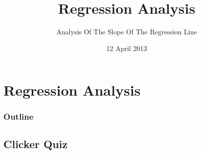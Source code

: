 
\section{Regression Analysis}

\title{Regression Analysis}
\subtitle{Analysis Of The Slope Of The Regression Line}

\date{12 April 2013}

\begin{frame}
  \titlepage
\end{frame}

\begin{frame}
  \frametitle{Outline}
  \tableofcontents[hideothersubsections,sectionstyle=show/hide]
\end{frame}


\subsection{Clicker Quiz}


